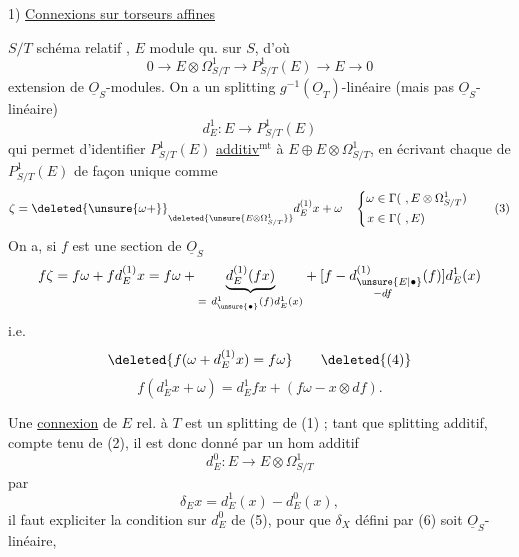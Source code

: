 1) \uline{Connexions sur torseurs affines}

$S/T$ schéma relatif , $E$ module qu.  sur $S$, d'où
\[
0\longrightarrow E\otimes\Omega^1_{S/T}\longrightarrow P^1_{S/T}(E)
\longrightarrow E\longrightarrow0 \tag*{(1)}
\]
extension de $\underline O_S$-modules. On a un splitting $g^{-1}(\underline O_T)$-linéaire
(mais pas $\underline O_S$-linéaire)
\[
d_E^1:E\longrightarrow P^1_{S/T}(E) \tag*{(2)}
\]
qui permet d'identifier $P^1_{S/T}(E)$ \uline{additiv$^{\mathrm{mt}}$} à $E\oplus E\otimes\Omega^1_{S/T}$, en
écrivant chaque  de $P^1_{S/T}(E)$
 de façon unique comme
\[
\zeta=\deleted{\unsure{\omega+}}\underset{\deleted{\unsure{E\otimes\Omega^1_{S/T}}}}{\,}
 d_E^{(1)}x+\omega\quad
 \left\{\begin{aligned}\omega&\in\Gamma(\ ,E\otimes\Omega^1_{S/T})\\
 x&\in\Gamma(\ ,E)\end{aligned}\right. \tag*{(3)}
\]
On a, si  $f$ est une section de $\underline O_S$
\[
f\zeta=f\omega+fd_E^{(1)}x=f\omega+
\underset{=\ d^1_{\unsure{\bullet}}(f)d^1_E(x)}{\underbrace{d_E^{(1)}(fx)}}+
\underset{-df}{[f-d_{\unsure{E|\bullet}}^{(1)}(f)]}d_E^1(x)
\]
i.e.
\[
\deleted{f(\omega+d_E^{(1)}x)=f\omega}\tag*{\deleted{(4)}}
\]
\[
f(d_E^1x+\omega)=d_E^1fx+(f\omega-x\otimes df).\tag*{(4)}
\]

Une \uline{connexion}  de $E$ rel. à $T$ est un splitting  de (1) ;
 tant que splitting additif, compte tenu de
(2), il est donc donné par un hom additif
\[
d_E^0:E\longrightarrow E\otimes\Omega^1_{S/T} \tag*{(5)}
\]
par
\[
\delta_E x=d_E^1(x)-d_E^0(x), \tag*{(6)}
\]
il faut expliciter la condition sur $d_E^0$ de (5),
pour que $\delta_X$ défini par (6) soit $\underline O_S$-linéaire,
